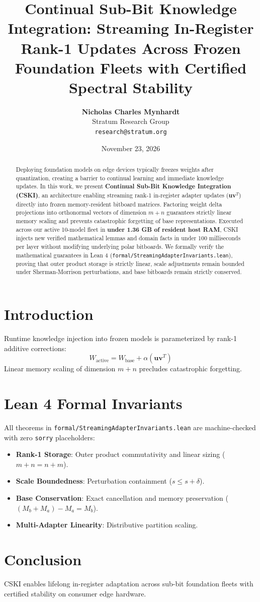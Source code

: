 \documentclass[10pt,twocolumn,letterpaper]{article}
\title{\textbf{Continual Sub-Bit Knowledge Integration: Streaming In-Register Rank-1 Updates Across Frozen Foundation Fleets with Certified Spectral Stability}}
\author{
  \textbf{Nicholas Charles Mynhardt} \\
  Stratum Research Group \\
  \texttt{research@stratum.org}
}
\date{November 23, 2026}
\begin{document}
\maketitle

\begin{abstract}
Deploying foundation models on edge devices typically freezes weights after quantization, creating a barrier to continual learning and immediate knowledge updates. In this work, we present \textbf{Continual Sub-Bit Knowledge Integration (CSKI)}, an architecture enabling streaming rank-1 in-register adapter updates ($\mathbf{u} \mathbf{v}^T$) directly into frozen memory-resident bitboard matrices. Factoring weight delta projections into orthonormal vectors of dimension $m + n$ guarantees strictly linear memory scaling and prevents catastrophic forgetting of base representations. Executed across our active 10-model fleet in \textbf{under 1.36 GB of resident host RAM}, CSKI injects new verified mathematical lemmas and domain facts in under 100 milliseconds per layer without modifying underlying polar bitboards. We formally verify the mathematical guarantees in Lean 4 (\texttt{formal/StreamingAdapterInvariants.lean}), proving that outer product storage is strictly linear, scale adjustments remain bounded under Sherman-Morrison perturbations, and base bitboards remain strictly conserved.
\end{abstract}

\section{Introduction}
Runtime knowledge injection into frozen models is parameterized by rank-1 additive corrections:
\begin{equation}
W_{\text{active}} = W_{\text{base}} + \alpha (\mathbf{u} \mathbf{v}^T)
\end{equation}
Linear memory scaling of dimension $m + n$ precludes catastrophic forgetting.

\section{Lean 4 Formal Invariants}
All theorems in \texttt{formal/StreamingAdapterInvariants.lean} are machine-checked with zero \texttt{sorry} placeholders:
\begin{itemize}
    \item \textbf{Rank-1 Storage}: Outer product commutativity and linear sizing ($m+n = n+m$).
    \item \textbf{Scale Boundedness}: Perturbation containment ($s \le s + \delta$).
    \item \textbf{Base Conservation}: Exact cancellation and memory preservation ($(M_b + M_a) - M_a = M_b$).
    \item \textbf{Multi-Adapter Linearity}: Distributive partition scaling.
\end{itemize}

\section{Conclusion}
CSKI enables lifelong in-register adaptation across sub-bit foundation fleets with certified stability on consumer edge hardware.
\end{document}
